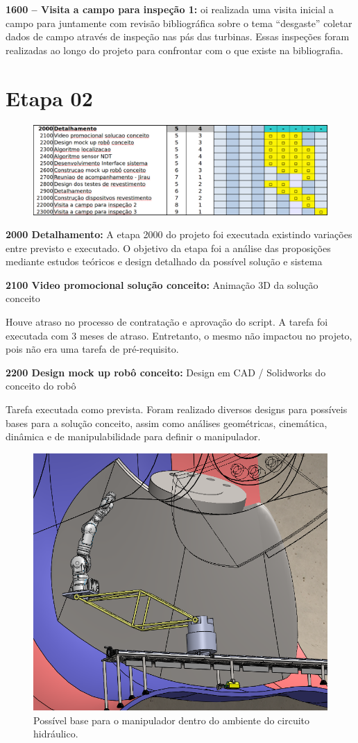 \textbf{1600 – Visita a campo para inspeção 1:} oi realizada uma visita inicial
a campo para juntamente com revisão bibliográfica sobre o tema “desgaste”
coletar dados de campo através de inspeção nas pás das turbinas. Essas inspeções
foram realizadas ao longo do projeto para confrontar com o que existe na
bibliografia.


\section{Etapa 02}

\begin{figure}[H]
\centering
\includegraphics[width=0.9\columnwidth]{figs/etapa2_completo}
\end{figure} 

\noindent
\textbf{2000 Detalhamento:} A etapa 2000 do projeto foi executada existindo
variações entre previsto e executado. O objetivo da etapa foi a análise das
proposições mediante estudos teóricos e design detalhado da possível solução e sistema

\noindent
\textbf{2100 Video promocional solução conceito:} Animação 3D da solução
conceito

Houve atraso no processo de contratação e aprovação do script. A tarefa foi
executada com 3 meses de atraso. Entretanto, o mesmo não impactou no projeto,
pois não era uma tarefa de pré-requisito.

\noindent
\textbf{2200 Design mock up robô conceito:} Design em CAD / Solidworks do
conceito do robô

Tarefa executada como prevista. Foram realizado diversos designs para possíveis
bases para a solução conceito, assim como análises geométricas, cinemática,
dinâmica e de manipulabilidade para definir o manipulador.

\begin{figure}\centering
\includegraphics[width=0.6\columnwidth]{figs/EMMA_Base_Conceito_PRR}
\caption{Possível base para o manipulador dentro do ambiente do circuito
hidráulico.}
\end{figure} 


